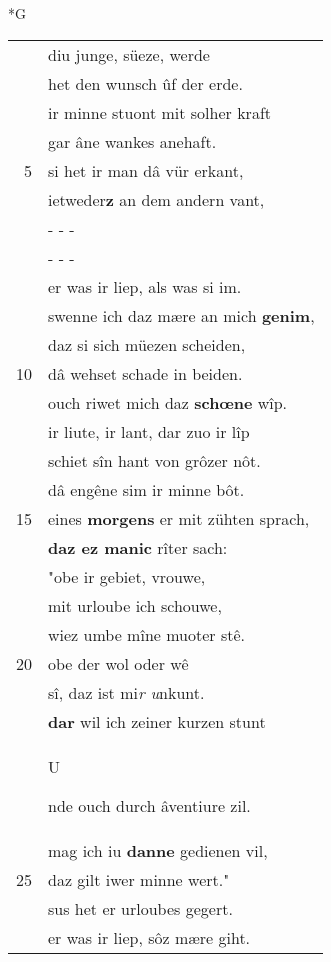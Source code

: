 \documentclass[8pt,a4paper,notitlepage]{article}
\begin{document}
\begin{table}[ht]
\begin{minipage}[t]{0.5\linewidth}
\small
\begin{center}*G
\end{center}
\begin{tabular}{rl}
 & diu junge, süeze, werde\\ 
 & het den wunsch ûf der erde.\\ 
 & ir minne stuont mit solher kraft\\ 
 & gar âne wankes anehaft.\\ 
5 & si het ir man dâ vür erkant,\\ 
 & ietweder\textbf{z} an dem andern vant,\\ 
 & \multicolumn{1}{l}{ - - - }\\ 
 & \multicolumn{1}{l}{ - - - }\\ 
 & er was ir liep, als was si im.\\ 
 & swenne ich daz mære an mich \textbf{genim},\\ 
 & daz si sich müezen scheiden,\\ 
10 & dâ wehset schade in beiden.\\ 
 & ouch riwet mich daz \textbf{schœne} wîp.\\ 
 & ir liute, ir lant, dar zuo ir lîp\\ 
 & schiet sîn hant von grôzer nôt.\\ 
 & dâ engêne sim ir minne bôt.\\ 
15 & eines \textbf{morgens} er mit zühten sprach,\\ 
 & \textbf{daz ez manic} rîter sach:\\ 
 & "obe ir gebiet, vrouwe,\\ 
 & mit urloube ich schouwe,\\ 
 & wiez umbe mîne muoter stê.\\ 
20 & obe der wol oder wê\\ 
 & sî, daz ist mi\textit{r u}nkunt.\\ 
 & \textbf{dar} wil ich zeiner kurzen stunt\\ 
 & \begin{large}U\end{large}nde ouch durch âventiure zil.\\ 
 & mag ich iu \textbf{danne} gedienen vil,\\ 
25 & daz gilt iwer minne wert."\\ 
 & sus het er urloubes gegert.\\ 
 & er was ir liep, sôz mære giht.\\ 

\end{tabular}
\end{minipage}
\end{table}
\end{document}
